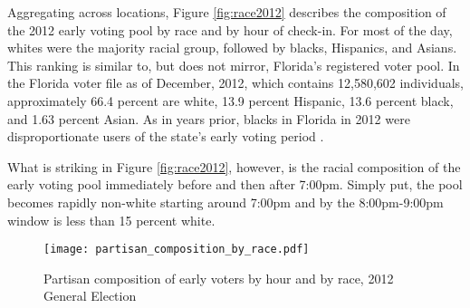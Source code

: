 \documentclass[12pt,titlepage]{article}
\begin{document}
Aggregating across locations, Figure \ref{fig:race2012} describes the
composition of the 2012 early voting pool by race and by hour of
check-in.  For most of the day, whites were the majority racial group,
followed by blacks, Hispanics, and Asians.  This ranking is similar
to, but does not mirror, Florida's registered voter pool.  In the
Florida voter file as of December, 2012, which contains 12,580,602
individuals, approximately 66.4 percent are white, 13.9 percent
Hispanic, 13.6 percent black, and 1.63 percent Asian.  As in years
prior, blacks in Florida in 2012 were disproportionate users of the
state's early voting period \citep{herronsmith:souls}.





What is striking in Figure \ref{fig:race2012}, however, is the racial
composition of the early voting pool immediately before and then after
7:00pm.  Simply put, the pool becomes rapidly non-white starting
around 7:00pm and by the 8:00pm-9:00pm window is less than 15 percent
white.

\begin{figure}[!ht]
\caption{Partisan composition of early voters by hour and by race, 2012
  General Election}
  \label{fig:party2012}
  \centering
    \centering\texttt{[image: partisan\_composition\_by\_race.pdf]}
\end{figure}
\end{document}
